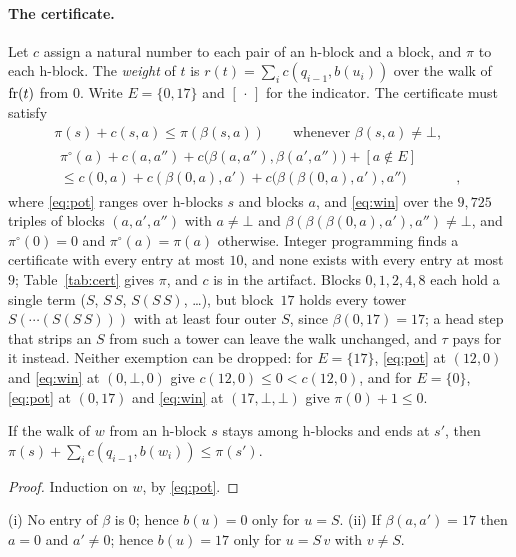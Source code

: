 \paragraph{The certificate.} Let $c$ assign a natural number to each pair of an h-block
and a block, and $\pi$ to each h-block. The \emph{weight} of $t$ is
$r(t)=\sum_{i}c(q_{i-1},b(u_i))$ over the walk of $\operatorname{fr}(t)$ from $0$. Write
$E=\{0,17\}$ and $[\,\cdot\,]$ for the indicator. The certificate must satisfy
\begin{gather}
\pi(s)+c(s,a)\le\pi(\beta(s,a))\qquad\text{whenever } \beta(s,a)\ne\bot,\label{eq:pot}\\
\begin{split}
\pi^{\circ}(a)+c(a,a'')+c\bigl(\beta(a,a''),\beta(a',a'')\bigr)+[a\notin E]\qquad&\\
\le c(0,a)+c(\beta(0,a),a')+c\bigl(\beta(\beta(0,a),a'),a''\bigr)&,
\end{split}\label{eq:win}
\end{gather}
where \eqref{eq:pot} ranges over h-blocks $s$ and blocks $a$, and \eqref{eq:win} over
the $9{,}725$ triples of blocks $(a,a',a'')$ with $a\ne\bot$ and
$\beta(\beta(\beta(0,a),a'),a'')\ne\bot$, and
$\pi^{\circ}(0)=0$ and $\pi^{\circ}(a)=\pi(a)$ otherwise. Integer programming finds a
certificate with every entry at most $10$, and none exists with every entry at most~$9$;
Table~\ref{tab:cert} gives $\pi$, and $c$ is  in the artifact.
Blocks $0,1,2,4,8$ each hold a single term ($S$, $S\,S$, $S(S\,S)$, \dots), but
block~$17$ holds every tower $S(\cdots(S(S\,S)))$ with at least four outer $S$,
since $\beta(0,17)=17$; a head step that strips an $S$ from such a tower can leave the
walk unchanged, and $\tau$ pays for it instead. Neither exemption can be dropped: for $E=\{17\}$, \eqref{eq:pot} at $(12,0)$ and
\eqref{eq:win} at $(0,\bot,0)$ give $c(12,0)\le0<c(12,0)$, and for $E=\{0\}$,
\eqref{eq:pot} at $(0,17)$ and \eqref{eq:win} at $(17,\bot,\bot)$ give
$\pi(0)+1\le0$.

\begin{lemma}[potential]\label{lem:pot}
If the walk of $w$ from an h-block $s$ stays among h-blocks and ends at $s'$, then
$\pi(s)+\sum_i c(q_{i-1},b(w_i))\le\pi(s')$.
\end{lemma}
\begin{proof}
Induction on $w$, by \eqref{eq:pot}.
\end{proof}

\begin{lemma}\label{lem:facts}
(i) No entry of $\beta$ is $0$; hence $b(u)=0$ only for $u=S$.
(ii) If $\beta(a,a')=17$ then $a=0$ and $a'\ne0$; hence $b(u)=17$
only for $u=S\,v$ with $v\ne S$.
\end{lemma}

